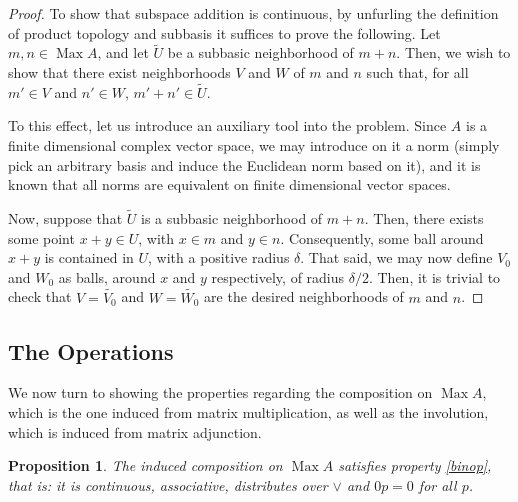 \documentclass{article}
\theoremstyle{plain}
\newtheorem{prop}{Proposition}
\theoremstyle{nonumberplain}
\newtheorem{proof}{Proof}
\DeclareMathOperator{\Max}{Max}
\begin{document}
\begin{proof}
To show that subspace addition is continuous, by unfurling the definition of product topology and subbasis it suffices to prove the following. Let $m,n \in \Max A$, and let $\tilde U$ be a subbasic neighborhood of $m+n$. Then, we wish to show that there exist neighborhoods $V$ and $W$ of $m$ and $n$ such that, for all $m' \in V$ and $n' \in W$, $m'+n' \in \tilde U$.

To this effect, let us introduce an auxiliary tool into the problem. Since $A$ is a finite dimensional complex vector space, we may introduce on it a norm (simply pick an arbitrary basis and induce the Euclidean norm based on it), and it is known that all norms are equivalent on finite dimensional vector spaces.

Now, suppose that $\tilde U$ is a subbasic neighborhood of $m+n$. Then, there exists some point $x+y \in U$, with $x \in m$ and $y \in n$. Consequently, some ball around $x+y$ is contained in $U$, with a positive radius $\delta$. That said, we may now define $V_0$ and $W_0$ as balls, around $x$ and $y$ respectively, of radius $\delta/2$. Then, it is trivial to check that $V = \tilde{V_0}$ and $W = \tilde{W_0}$ are the desired neighborhoods of $m$ and $n$.
\end{proof}

\subsection{The Operations}

We now turn to showing the properties regarding the composition on $\Max A$, which is the one induced from matrix multiplication, as well as the involution, which is induced from matrix adjunction.

\begin{prop}
The induced composition on $\Max A$ satisfies property \ref{binop}, that is: it is continuous, associative, distributes over $\lor$ and $0p = 0$ for all $p$.
\end{prop}
\end{document}

